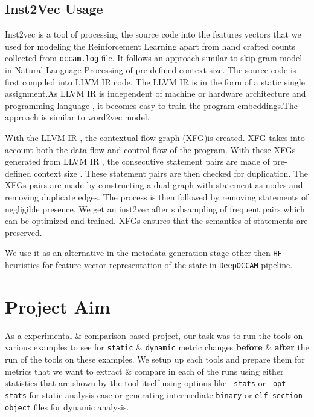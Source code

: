 \documentclass{relatorio}
\begin{document}
\subsection{Inst2Vec Usage}%
\label{Tools}

Inst2vec is a tool of processing the source code into the features vectors that we used for modeling the Reinforcement Learning apart from hand crafted counts collected from \texttt{occam.log} file. It follows an approach similar to skip-gram model in Natural Language Processing of pre-defined context size. The source code is first compiled into LLVM IR code. The LLVM IR is in the form of a static single assignment.As LLVM IR  is independent of machine or hardware architecture and programming language , it becomes easy to train the program embeddings.The approach is similar to word2vec model.

With the LLVM IR , the contextual flow graph (XFG)is created. XFG takes into account both the data flow and control flow of the program. With these XFGs generated from LLVM IR , the consecutive statement pairs are made of pre-defined context size . These statement pairs are then  checked for duplication. The XFGs pairs are made by constructing a dual graph with statement as nodes and removing duplicate edges. The process is then followed by removing statements of negligible presence. We get an inst2vec after subsampling of frequent pairs which can be optimized and trained. XFGs ensures that the semantics of statements are preserved.

We use it as an alternative in the metadata generation stage other then \texttt{HF} heuristics for feature vector
representation of the state in \texttt{DeepOCCAM} pipeline. 

\section{Project Aim}%
\label{Tools}

As a experimental \& comparison based project, our task was to run the tools on various examples to see for \texttt{static} 
\& \texttt{dynamic} metric changes \textbf{before} \& \textbf{after} the run of the tools on these examples. 
We setup up each tools and prepare them for metrics that we want to extract \& compare in each of the runs using either 
statistics that are shown by the tool itself using options like \texttt{--stats} or \texttt{--opt-stats} for static analysis case 
or generating intermediate \texttt{binary} or \texttt{elf-section object} files for dynamic analysis.
\end{document}
